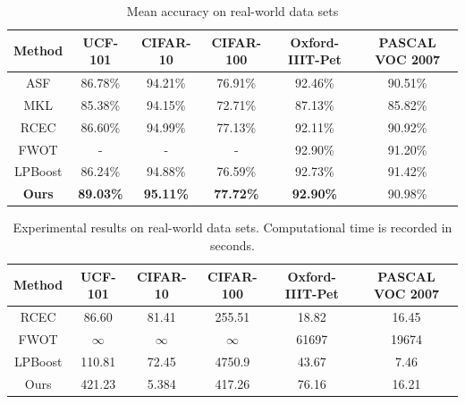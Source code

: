 \documentclass[letterpaper]{article}
\begin{document}
\begin{table}[t]
\centering
\begin{scriptsize}
\caption{Mean accuracy on real-world data sets}
\begin{tabular}{c|c|c|c|c|c}
\hline
Method              & UCF-101          & CIFAR-10         & CIFAR-100        & Oxford-IIIT-Pet & PASCAL VOC 2007    \\\hline
ASF                 & 86.78\%          & 94.21\%          & 76.91\%          & 92.46\%         &   90.51\%          \\
MKL                 & 85.38\%          & 94.15\%          & 72.71\%          & 87.13\%         &   85.82\%          \\
RCEC                & 86.60\%          & 94.99\%          & 77.13\%          & 92.11\%         &   90.92\%          \\
FWOT                & -                & -                & -                & 92.90\%         &   91.20\%          \\
LPBoost             & 86.24\%          & 94.88\%          & 76.59\%          & 92.73\%         &   91.42\%          \\\hline
\textbf{Ours}       & \textbf{89.03\%} & \textbf{95.11\%} & \textbf{77.72\%} & \textbf{92.90\%}&   90.98\%          \\
\hline
\end{tabular}
\end{scriptsize}
\label{table:total_acc}
\end{table}

\begin{table}[t]
\centering
\begin{scriptsize}
\caption{Experimental results on real-world data sets. Computational time is recorded in seconds.}
\begin{tabular}{c|c|c|c|c|c}
\hline
Method              & UCF-101    & CIFAR-10  & CIFAR-100  & Oxford-IIIT-Pet & PASCAL VOC 2007 \\\hline
RCEC                & 86.60      & 81.41     &  255.51    & 18.82           &   16.45         \\
FWOT                & $\infty$   & $\infty$  & $\infty$   & 61697           &   19674         \\
LPBoost             & 110.81     & 72.45     &  4750.9    & 43.67           &   7.46          \\\hline
Ours                & 421.23     & 5.384     &  417.26    & 76.16           &   16.21         \\
\hline
\end{tabular}
\end{scriptsize}
\label{table:total_time}
\end{table}
\end{document}
